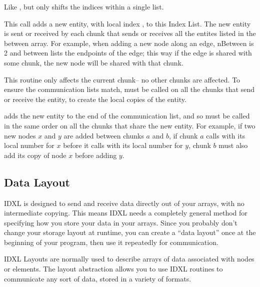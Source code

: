 Like , but only shifts the indices within a single list.



This call adds a new entity, with local index , to this Index List.  The new entity is sent or received by each chunk that sends or receives all the entites listed in the between array.  For example, when adding a new node along an edge, nBetween is 2 and between lists the endpoints of the edge; this way if the edge is shared with some chunk, the new node will be shared with that chunk.

This routine only affects the current chunk-- no other chunks are affected.  To ensure the communication lists match,  must be called on all the chunks that send or receive the entity, to create the local copies of the entity.

 adds the new entity to the end of the communication list, and so must be called in the same order on all the chunks that share the new entity.  For example, if two new nodes $x$ and $y$ are added between chunks $a$ and $b$, if chunk $a$ calls  with its local number for $x$ before it calls  with its local number for $y$, chunk $b$ must also add its copy of node $x$ before adding $y$.


\subsection{Data Layout}
\label{sec:IDXL_Layout}
IDXL is designed to send and receive data directly out of your arrays, with no intermediate copying.  This means IDXL needs a completely general method for specifying how you store your data in your arrays.  Since you probably don't change your storage layout at runtime, you can create a ``data layout'' once at the beginning of your program, then use it repeatedly for communication.

IDXL Layouts are normally used to describe arrays of data associated with nodes or elements.  The layout abstraction allows you to use IDXL routines to communicate any sort of data, stored in a variety of formats.


